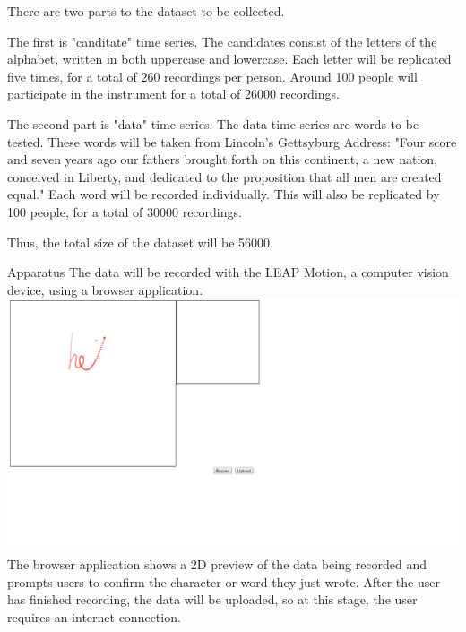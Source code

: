 There are two parts to the dataset to be collected.

The first is "canditate" time series. The candidates consist of the letters of the alphabet, written in both uppercase and lowercase. Each letter will be replicated five times, for a total of 260 recordings per person. Around 100 people will participate in the instrument for a total of 26000 recordings.

The second part is "data" time series. The data time series are words to be tested. These words will be taken from Lincoln's Gettsyburg Address: "Four score and seven years ago our fathers brought forth on this continent, a new nation, conceived in Liberty, and dedicated to the proposition that all men are created equal." Each word will be recorded individually. This will also be replicated by 100 people, for a total of 30000 recordings.

Thus, the total size of the dataset will be 56000.

Apparatus
The data will be recorded with the LEAP Motion, a computer vision device, using a browser application. 
\includegraphics[width=\columnwidth]{images/recording-1.PNG}
The browser application shows a 2D preview of the data being recorded and prompts users to confirm the character or word they just wrote.
After the user has finished recording, the data will be uploaded, so at this stage, the user requires an internet connection.
